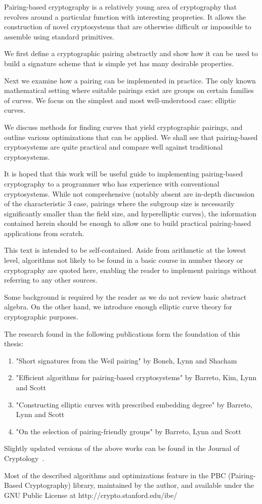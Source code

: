\beforepreface
{}
Pairing-based cryptography is a relatively young area of cryptography that
revolves around a particular function with interesting propreties.
It allows the construction of novel cryptosystems that are otherwise
difficult or impossible to assemble using standard primitives.

We first define a cryptographic pairing abstractly and show how it
can be used to build a signature scheme that is simple yet has many
desirable properties.

Next we examine how a pairing can be implemented in practice. The only known
mathematical setting where suitable pairings exist are groups on certain
families of curves. We focus on the simplest and most well-understood case:
elliptic curves.

We discuss methods for finding curves that yield cryptographic pairings,
and outline various optimizations that can be applied. We shall see that
pairing-based cryptosystems are quite practical and compare well against
traditional cryptosystems.

It is hoped that this work will be useful guide to implementing pairing-based
cryptography to a programmer who has experience with conventional
cryptosystems. While not comprehensive (notably absent are in-depth
discussion of the characteristic 3 case, pairings where
the subgroup size is necessarily significantly smaller than the field size,
and hyperelliptic curves),
the information contained herein should be enough to allow one to build
practical pairing-based applications from scratch.

This text is intended to be self-contained. Aside from
arithmetic at the lowest level, algorithms not likely to
be found in a basic course in number theory or cryptography are quoted here,
enabling the reader to implement pairings without referring to any other
sources.

Some background is required by the reader as
we do not review basic abstract algebra.
On the other hand, we introduce enough elliptic curve theory for
cryptographic purposes.

The research found in the following publications
form the foundation of this thesis:
\begin{enumerate}
\item "Short signatures from the Weil pairing" by Boneh, Lynn and Shacham~\cite{bls}
\item "Efficient algorithms for pairing-based cryptosystems" by Barreto, Kim, Lynn and Scott~\cite{bakls}
\item "Constructing elliptic curves with prescribed embedding degree" by Barreto, Lynn and Scott~\cite{bals}
\item "On the selection of pairing-friendly groups" by Barreto, Lynn and Scott~\cite{bals2}
\end{enumerate}
Slightly updated versions of the above works can be found
in the Journal of Cryptology~\cite{blsjournal, balsjournal}.

Most of the described algorithms and optimizations
feature in the PBC (Pairing-Based Cryptography) library, maintained by the
author, and available under the GNU Public License at 
http://crypto.stanford.edu/ibe/
